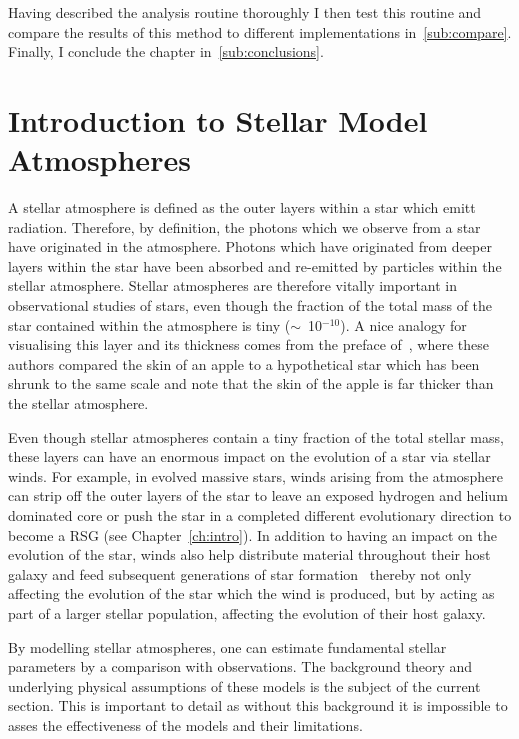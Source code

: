 Having described the analysis routine thoroughly I then test this routine and compare the results of this method to different implementations in~\ref{sub:compare}.
Finally, I conclude the chapter in~\ref{sub:conclusions}.

\section{Introduction to Stellar Model Atmospheres} %
\label{sub:model_atmospheres}

A stellar atmosphere is defined as the outer layers within a star which emitt radiation.
Therefore, by definition, the photons which we observe from a star have originated in the atmosphere.
Photons which have originated from deeper layers within the star have been absorbed and re-emitted by particles within the stellar atmosphere.
Stellar atmospheres are therefore vitally important in observational studies of stars, even though the fraction of the total mass of the star contained within the atmosphere is tiny ($\sim$~10$^{-10}$).
A nice analogy for visualising this layer and its thickness comes from the preface of~\cite{1989isa2.book.....B}, where these authors compared the skin of an apple to a hypothetical star which has been shrunk to the same scale and note that the skin of the apple is far thicker than the stellar atmosphere.


Even though stellar atmospheres contain a tiny fraction of the total stellar mass, these layers can have an enormous impact on the evolution of a star via stellar winds.
For example, in evolved massive stars, winds arising from the atmosphere can strip off the outer layers of the star to leave an exposed hydrogen and helium dominated core or push the star in a completed different evolutionary direction to become a RSG (see Chapter~\ref{ch:intro}).
In addition to having an impact on the evolution of the star, winds also help distribute material throughout their host galaxy and feed subsequent generations of star formation~\citep[e.g.][]{2011MNRAS.417..950H,2012MNRAS.421.3522H} thereby not only affecting the evolution of the star which the wind is produced, but by acting as part of a larger stellar population, affecting the evolution of their host galaxy.

By modelling stellar atmospheres, one can estimate fundamental stellar parameters by a comparison with observations.
The background theory and underlying physical assumptions of these models is the subject of the current section.
This is important to detail as without this background it is impossible to asses the effectiveness of the models and their limitations.

